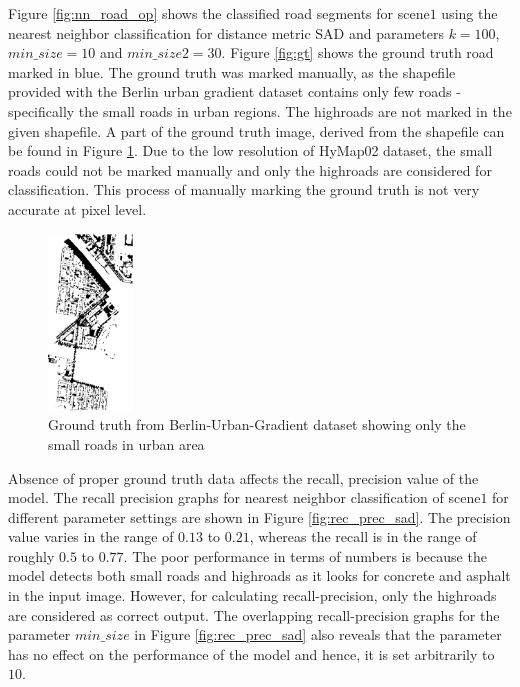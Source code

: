 \documentclass[12pt,twoside]{article}
\theoremstyle{plain}
\theoremstyle{definition}
\theoremstyle{remark}
\newcommand{\forceindent}{\leavevmode{\parindent=2em\indent}}
\begin{document}
\forceindent Figure \ref{fig:nn_road_op} shows the classified road segments for scene$1$ using the nearest neighbor classification for distance metric SAD and parameters $k=100$, $min\_size=10$ and $min\_size2=30$. Figure \ref{fig:gt} shows the ground truth road marked in blue. The ground truth was marked manually, as the shapefile provided with the Berlin urban gradient dataset contains only few roads - specifically the small roads in urban regions. The highroads are not marked in the given shapefile. A part of the ground truth image, derived from the shapefile can be found in Figure \ref{fig:gt_shpfile}. Due to the low resolution of HyMap02 dataset, the small roads could not be marked manually and only the highroads are considered for classification. This process of manually marking the ground truth is not very accurate at pixel level.\\
\begin{figure}
\includegraphics[width=0.2\textwidth]{src/gt_Berlin_Urban_Gradient_2009_pavement.eps}
\caption{Ground truth from Berlin-Urban-Gradient dataset showing only the small roads in urban area}
\label{fig:gt_shpfile}
\end{figure}
\forceindent Absence of proper ground truth data affects the recall, precision value of the model. The recall precision graphs for nearest neighbor classification of scene$1$ for different parameter settings are shown in Figure \ref{fig:rec_prec_sad}. The precision value varies in the range of $0.13$ to $0.21$, whereas the recall is in the range of roughly $0.5$ to $0.77$. The poor performance in terms  of numbers is because the model detects both small roads and highroads as it looks for concrete and asphalt in the input image. However, for calculating recall-precision, only the highroads are considered as correct output. The overlapping recall-precision graphs for the parameter $min\_size$ in Figure \ref{fig:rec_prec_sad} also reveals that the parameter has no effect on the performance of the model and hence, it is set arbitrarily to $10$. 
\end{document}
